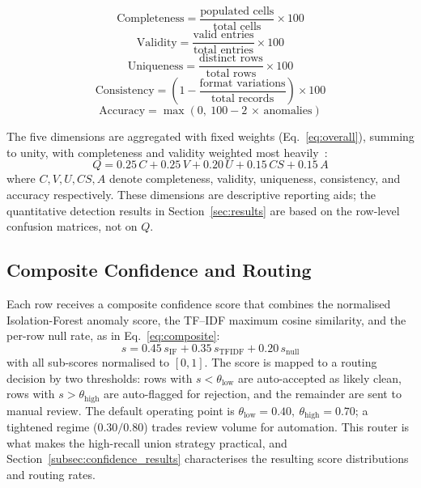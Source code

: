 \documentclass{ieeeaccess}
\begin{document}
\begin{equation}
\mathrm{Completeness} = \frac{\text{populated cells}}{\text{total cells}} \times 100
\label{eq:completeness}
\end{equation}
\begin{equation}
\mathrm{Validity} = \frac{\text{valid entries}}{\text{total entries}} \times 100
\label{eq:validity}
\end{equation}
\begin{equation}
\mathrm{Uniqueness} = \frac{\text{distinct rows}}{\text{total rows}} \times 100
\label{eq:uniqueness}
\end{equation}
\begin{equation}
\mathrm{Consistency} = \left(1 - \frac{\text{format variations}}{\text{total records}}\right) \times 100
\label{eq:consistency}
\end{equation}
\begin{equation}
\mathrm{Accuracy} = \max\!\left(0,\ 100 - 2\,\times\,\text{anomalies}\right)
\label{eq:accuracy_dim}
\end{equation}

The five dimensions are aggregated with fixed weights (Eq.~\ref{eq:overall}), summing to unity, with completeness and
validity weighted most heavily~\cite{pipino2002understanding,strong1997data}:
\begin{equation}
Q = 0.25\,C + 0.25\,V + 0.20\,U + 0.15\,\mathit{CS} + 0.15\,A
\label{eq:overall}
\end{equation}
where $C,V,U,\mathit{CS},A$ denote completeness, validity, uniqueness, consistency, and accuracy respectively. These
dimensions are descriptive reporting aids; the quantitative detection results in Section~\ref{sec:results} are based on
the row-level confusion matrices, not on $Q$.

\subsection{Composite Confidence and Routing}
\label{subsec:confidence}
Each row receives a composite confidence score that combines the normalised Isolation-Forest anomaly score, the TF--IDF
maximum cosine similarity, and the per-row null rate, as in Eq.~\ref{eq:composite}:
\begin{equation}
s = 0.45\,s_{\mathrm{IF}} + 0.35\,s_{\mathrm{TFIDF}} + 0.20\,s_{\mathrm{null}}
\label{eq:composite}
\end{equation}
with all sub-scores normalised to $[0,1]$. The score is mapped to a routing decision by two thresholds: rows with
$s<\theta_{\mathrm{low}}$ are auto-accepted as likely clean, rows with $s>\theta_{\mathrm{high}}$ are auto-flagged for
rejection, and the remainder are sent to manual review. The default operating point is
$\theta_{\mathrm{low}}=0.40,\ \theta_{\mathrm{high}}=0.70$; a tightened regime ($0.30/0.80$) trades review volume for
automation. This router is what makes the high-recall union strategy practical, and Section~\ref{subsec:confidence_results}
characterises the resulting score distributions and routing rates.
\end{document}
